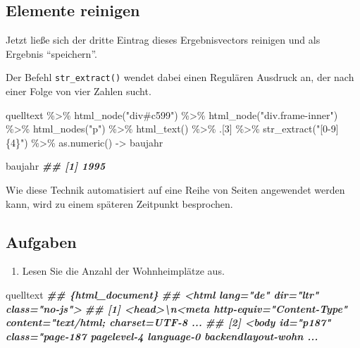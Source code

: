 \documentclass[
  ngerman,
]{article}
\newenvironment{Shaded}{\begin{snugshade}}{\end{snugshade}}
\newcommand{\DecValTok}[1]{\textcolor[rgb]{0.00,0.00,0.81}{#1}}
\newcommand{\DocumentationTok}[1]{\textcolor[rgb]{0.56,0.35,0.01}{\textbf{\textit{#1}}}}
\newcommand{\FunctionTok}[1]{\textcolor[rgb]{0.00,0.00,0.00}{#1}}
\newcommand{\NormalTok}[1]{#1}
\newcommand{\OtherTok}[1]{\textcolor[rgb]{0.56,0.35,0.01}{#1}}
\newcommand{\SpecialCharTok}[1]{\textcolor[rgb]{0.00,0.00,0.00}{#1}}
\newcommand{\StringTok}[1]{\textcolor[rgb]{0.31,0.60,0.02}{#1}}
\providecommand{\tightlist}{%
  \setlength{\itemsep}{0pt}\setlength{\parskip}{0pt}}
\begin{document}
\hypertarget{elemente-reinigen}{%
\subsection{Elemente reinigen}\label{elemente-reinigen}}

Jetzt ließe sich der dritte Eintrag dieses Ergebnisvectors reinigen und als Ergebnis ``speichern''.

Der Befehl \texttt{str\_extract()} wendet dabei einen Regulären Ausdruck an, der nach einer Folge von vier Zahlen sucht.

\begin{Shaded}
\begin{Highlighting}[]
\NormalTok{quelltext }\SpecialCharTok{\%\textgreater{}\%}
  \FunctionTok{html\_node}\NormalTok{(}\StringTok{"div\#c599"}\NormalTok{) }\SpecialCharTok{\%\textgreater{}\%}
  \FunctionTok{html\_node}\NormalTok{(}\StringTok{"div.frame{-}inner"}\NormalTok{) }\SpecialCharTok{\%\textgreater{}\%}
  \FunctionTok{html\_nodes}\NormalTok{(}\StringTok{"p"}\NormalTok{) }\SpecialCharTok{\%\textgreater{}\%}
  \FunctionTok{html\_text}\NormalTok{() }\SpecialCharTok{\%\textgreater{}\%}
\NormalTok{  .[}\DecValTok{3}\NormalTok{] }\SpecialCharTok{\%\textgreater{}\%}
  \FunctionTok{str\_extract}\NormalTok{(}\StringTok{"[0{-}9]\{4\}"}\NormalTok{) }\SpecialCharTok{\%\textgreater{}\%}
  \FunctionTok{as.numeric}\NormalTok{() }\OtherTok{{-}\textgreater{}}\NormalTok{ baujahr}

\NormalTok{baujahr}
\DocumentationTok{\#\# [1] 1995}
\end{Highlighting}
\end{Shaded}

Wie diese Technik automatisiert auf eine Reihe von Seiten angewendet werden kann, wird zu einem späteren Zeitpunkt besprochen.

\hypertarget{aufgaben-6}{%
\subsection{Aufgaben}\label{aufgaben-6}}

\begin{enumerate}
\def\labelenumi{\arabic{enumi}.}
\tightlist
\item
  Lesen Sie die Anzahl der Wohnheimplätze aus.
\end{enumerate}

\begin{Shaded}
\begin{Highlighting}[]
\NormalTok{quelltext}
\DocumentationTok{\#\# \{html\_document\}}
\DocumentationTok{\#\# \textless{}html lang="de" dir="ltr" class="no{-}js"\textgreater{}}
\DocumentationTok{\#\# [1] \textless{}head\textgreater{}\textbackslash{}n\textless{}meta http{-}equiv="Content{-}Type" content="text/html; charset=UTF{-}8 ...}
\DocumentationTok{\#\# [2] \textless{}body id="p187" class="page{-}187 pagelevel{-}4 language{-}0 backendlayout{-}wohn ...}
\end{Highlighting}
\end{Shaded}
\end{document}
